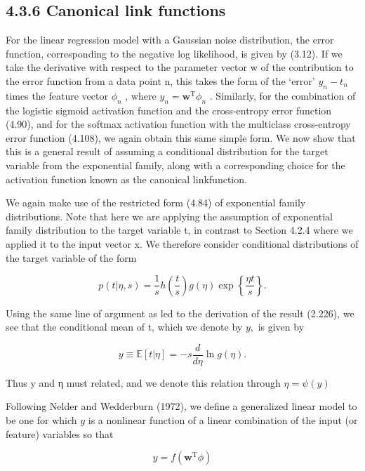 \documentclass[
  10
]{article}
\begin{document}
\subsection{4.3.6 Canonical link
functions}\label{canonical-link-functions}

For the linear regression model with a Gaussian noise distribution, the
error function, corresponding to the negative log likelihood, is given
by (3.12). If we take the derivative with respect to the parameter
vector w of the contribution to the error function from a data point n,
this takes the form of the `error' \(y _ { n } - t _ { n }\) times the
feature vector \(\phi _ { n }\) , where
\(y _ { n } = \mathbf { w } ^ { \mathrm { T } } \phi _ { n }\) .
Similarly, for the combination of the logistic sigmoid activation
function and the cross-entropy error function (4.90), and for the
softmax activation function with the multiclass cross-entropy error
function (4.108), we again obtain this same simple form. We now show
that this is a general result of assuming a conditional distribution for
the target variable from the exponential family, along with a
corresponding choice for the activation function known as the canonical
linkfunction.

We again make use of the restricted form (4.84) of exponential family
distributions. Note that here we are applying the assumption of
exponential family distribution to the target variable t, in contrast to
Section 4.2.4 where we applied it to the input vector x. We therefore
consider conditional distributions of the target variable of the form

\[
p (t | \eta , s) = \frac {1}{s} h \left(\frac {t}{s}\right) g (\eta) \exp \left\{\frac {\eta t}{s} \right\}.\tag{4.118}
\]

Using the same line of argument as led to the derivation of the result
(2.226), we see that the conditional mean of t, which we denote by
\(y ,\) is given by

\[
y \equiv \mathbb {E} [ t | \eta ] = - s \frac {d}{d \eta} \ln g (\eta).\tag{4.119}
\]

Thus y and η must related, and we denote this relation through
\(\eta = \psi ( y )\)

Following Nelder and Wedderburn (1972), we define a generalized linear
model to be one for which \(y\) is a nonlinear function of a linear
combination of the input (or feature) variables so that

\[
y = f (\mathbf {w} ^ {\mathrm{T}} \phi)\tag{4.120}
\]
\end{document}
